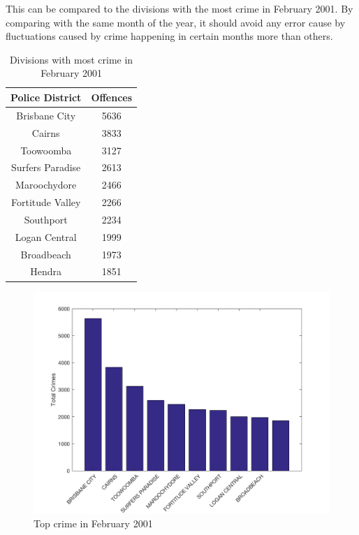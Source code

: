 \documentclass[]{article}
\begin{document}
This can be compared to the divisions with the most crime in February 2001. By comparing with the same month of the year, it should avoid any error cause by fluctuations caused by crime happening in certain months more than others.

\begin{table}[H]
    \caption{Divisions with most crime in February 2001}
    \centering
    \begin{tabular}{|c|c|}
        \hline
        Police District & Offences \\
        \hline
        Brisbane City & 5636 \\
        Cairns & 3833 \\
        Toowoomba & 3127 \\
        Surfers Paradise & 2613 \\
        Maroochydore & 2466 \\
        Fortitude Valley & 2266 \\
        Southport & 2234 \\
        Logan Central & 1999 \\
        Broadbeach & 1973 \\
        Hendra & 1851 \\
        \hline
    \end{tabular}
\end{table}

\begin{figure}[H]
    \caption{Top crime in February 2001}
    \centering
    \includegraphics[width=\linewidth]{../images/top_crime_2001}
\end{figure}
\end{document}

